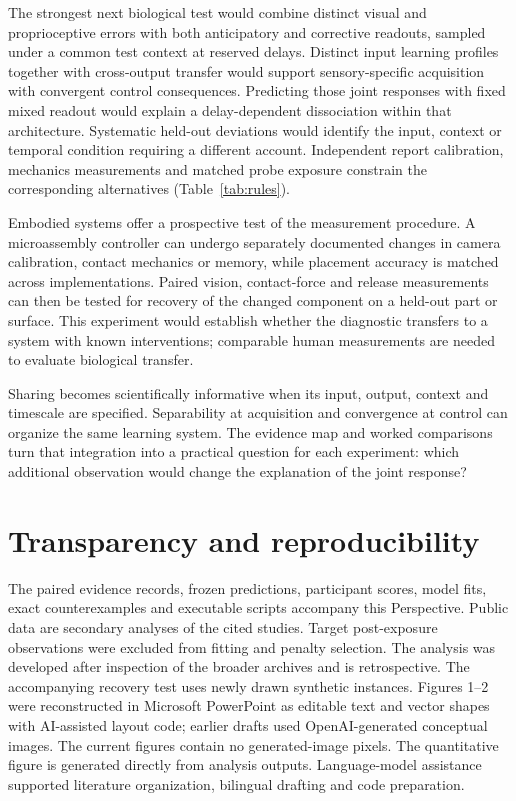 \documentclass[11pt,a4paper]{article}
\begin{document}
The strongest next biological test would combine distinct visual and proprioceptive errors with both anticipatory and corrective readouts, sampled under a common test context at reserved delays. Distinct input learning profiles together with cross-output transfer would support sensory-specific acquisition with convergent control consequences. Predicting those joint responses with fixed mixed readout would explain a delay-dependent dissociation within that architecture. Systematic held-out deviations would identify the input, context or temporal condition requiring a different account. Independent report calibration, mechanics measurements and matched probe exposure constrain the corresponding alternatives (Table~\ref{tab:rules}).

Embodied systems offer a prospective test of the measurement procedure. A microassembly controller can undergo separately documented changes in camera calibration, contact mechanics or memory, while placement accuracy is matched across implementations. Paired vision, contact-force and release measurements can then be tested for recovery of the changed component on a held-out part or surface. This experiment would establish whether the diagnostic transfers to a system with known interventions; comparable human measurements are needed to evaluate biological transfer.

Sharing becomes scientifically informative when its input, output, context and timescale are specified. Separability at acquisition and convergence at control can organize the same learning system. The evidence map and worked comparisons turn that integration into a practical question for each experiment: which additional observation would change the explanation of the joint response?

\section{Transparency and reproducibility}
The paired evidence records, frozen predictions, participant scores, model fits, exact counterexamples and executable scripts accompany this Perspective. Public data are secondary analyses of the cited studies. Target post-exposure observations were excluded from fitting and penalty selection. The analysis was developed after inspection of the broader archives and is retrospective. The accompanying recovery test uses newly drawn synthetic instances. Figures 1--2 were reconstructed in Microsoft PowerPoint as editable text and vector shapes with AI-assisted layout code; earlier drafts used OpenAI-generated conceptual images. The current figures contain no generated-image pixels. The quantitative figure is generated directly from analysis outputs. Language-model assistance supported literature organization, bilingual drafting and code preparation.
\end{document}

